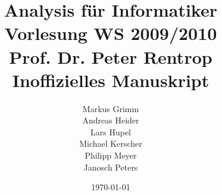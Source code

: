 


\title{Analysis für Informatiker\\\large Vorlesung WS 2009/2010\\Prof. Dr. Peter Rentrop\\Inoffizielles Manuskript}
\author{Markus Grimm\\ Andreas Heider\\ Lars Hupel\\ Michael Kerscher\\ Philipp Meyer\\Janosch Peters}
\date{\today}



\maketitle

\newpage
\listoftodos
\newpage
\tableofcontents
\newpage
{}
{}
\listoflectures
\newpage













\newpage
{}
{}



